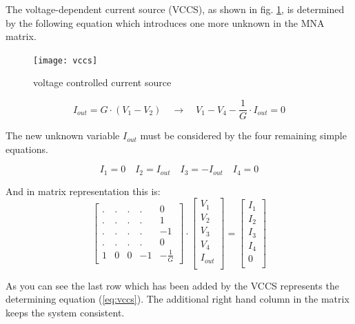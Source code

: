 \documentclass[10pt]{report}
\begin{document}
The voltage-dependent current source (VCCS), as shown in fig.
\ref{fig:vccs}, is determined by the following equation which
introduces one more unknown in the MNA matrix.

\begin{figure}[ht]
\begin{center}
\texttt{[image: vccs]}
\end{center}
\caption{voltage controlled current source}
\label{fig:vccs}
\end{figure}
\FloatBarrier

\begin{equation}
I_{out} = G\cdot\left(V_{1} - V_{2}\right)
\quad \rightarrow \quad
V_{1} - V_{4} - \frac{1}{G}\cdot I_{out} = 0
\label{eq:vccs}
\end{equation}

The new unknown variable $I_{out}$ must be considered by the four
remaining simple equations.

\begin{equation}
I_{1} = 0 \quad I_{2} = I_{out} \quad I_{3} = -I_{out} \quad I_{4} = 0
\end{equation}

And in matrix representation this is:
\begin{equation}
\begin{bmatrix}
.&.&.&.& 0\\
.&.&.&.& 1\\
.&.&.&.& -1\\
.&.&.&.& 0\\
1 & 0 & 0 & -1 & -\frac{1}{G}
\end{bmatrix}
\cdot
\begin{bmatrix}
V_{1}\\
V_{2}\\
V_{3}\\
V_{4}\\
I_{out}\\
\end{bmatrix}
=
\begin{bmatrix}
I_{1}\\
I_{2}\\
I_{3}\\
I_{4}\\
0\\
\end{bmatrix}
\end{equation}

As you can see the last row which has been added by the VCCS
represents the determining equation (\ref{eq:vccs}).  The additional
right hand column in the matrix keeps the system consistent.
\end{document}
